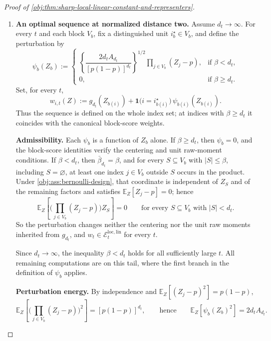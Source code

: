 \begin{proof}[Proof of \cref{obj:thm:sharp-local-linear-constant-and-representers}]
\begin{enumerate}
\item \textbf{An optimal sequence at normalized distance two.}  Assume \(d_t\to\infty\).  For every \(t\) and each block \(V_b\), fix a distinguished unit \(i_b^\star\in V_b\), and define the perturbation by
\[
\psi_b(Z_b)
:=
\begin{cases}
\left\{\dfrac{2d_tA_{d_t}}{[p(1-p)]^{d_t}}\right\}^{1/2}
\prod_{j\in V_b}(Z_j-p), & \text{if }\beta<d_t,\\[1ex]
0, & \text{if }\beta\ge d_t.
\end{cases}
\]
Set, for every \(t\),
\[
w_{i,t}(Z)
:=
g_{d_t}(Z_{b(i)})
+
\mathbf 1\bigl(i=i^\star_{b(i)}\bigr)\,\psi_{b(i)}(Z_{b(i)}).
\]
Thus the sequence is defined on the whole index set; at indices with \(\beta\ge d_t\) it coincides with the canonical block-score weights. %

\textbf{Admissibility.}  Each \(\psi_b\) is a function of \(Z_b\) alone.  If \(\beta\ge d_t\), then \(\psi_b=0\), and the block-score identities verify the centering and unit raw-moment conditions.  If \(\beta<d_t\), then \(\bar\beta_{d_t}=\beta\), and for every \(S\subseteq V_b\) with \(|S|\le\beta\), including \(S=\varnothing\), at least one index \(j\in V_b\) outside \(S\) occurs in the product.  Under \cref{obj:ass:bernoulli-design}, that coordinate is independent of \(Z_S\) and of the remaining factors and satisfies \(\mathbb E_Z[Z_j-p]=0\); hence
\[
\mathbb E_Z\!\left[\bigl(\prod_{j\in V_b}(Z_j-p)\bigr)Z_S\right]=0
\qquad\text{for every }S\subseteq V_b\text{ with }|S|<d_t .
\]
So the perturbation changes neither the centering nor the unit raw moments inherited from \(g_{d_t}\), and \(w_t\in\mathcal E_t^{\mathrm{loc,lin}}\) for every \(t\).

Since \(d_t\to\infty\), the inequality \(\beta<d_t\) holds for all sufficiently large \(t\).  All remaining computations are on this tail, where the first branch in the definition of \(\psi_b\) applies.

\textbf{Perturbation energy.}  By independence and \(\mathbb E_Z[(Z_j-p)^2]=p(1-p)\),
\[
\mathbb E_Z\!\left[\bigl(\prod_{j\in V_b}(Z_j-p)\bigr)^2\right]=[p(1-p)]^{d_t},
\qquad\text{hence}\qquad
\mathbb E_Z\!\left[\psi_b(Z_b)^2\right]=2d_tA_{d_t}.
\]


\end{enumerate}
\end{proof}

